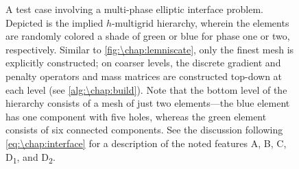 \begin{figure}[!t]
	\centering
	\footnotesize
	\sffamily
	\def\svgwidth{0.85\textwidth}
	\vspace{-0.5em}
	\caption{A test case involving a multi-phase elliptic interface problem. Depicted is the implied $h$-multigrid hierarchy, wherein the elements are randomly colored a shade of green or blue for phase one or two, respectively. Similar to \cref{fig:\chap:lemniscate}, only the finest mesh is explicitly constructed; on coarser levels, the discrete gradient and penalty operators and mass matrices are constructed top-down at each level (see \cref{alg:\chap:build}). Note that the bottom level of the hierarchy consists of a mesh of just two elements---the blue element has one component with five holes, whereas the green element consists of six connected components. See the discussion following \cref{eq:\chap:interface} for a description of the noted features \textsf{A}, \textsf{B}, \textsf{C}, \textsf{D\textsubscript{1}}, and \textsf{D\textsubscript{2}}.\vspace{-2em}}
  \label{fig:\chap:interface}
\end{figure}

